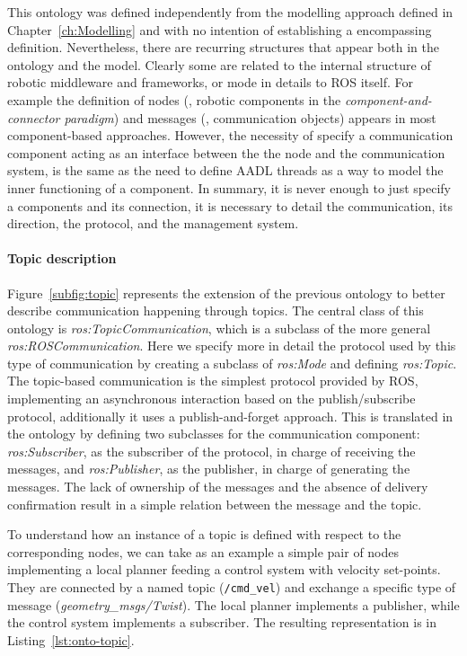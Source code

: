 This ontology was defined independently from the modelling approach defined in Chapter~\ref{ch:Modelling} and with no intention of establishing a encompassing definition. Nevertheless, there are recurring structures that appear both in the ontology and the  model. Clearly some are related to the internal structure of robotic middleware and frameworks, or mode in details to ROS itself. For example the definition of nodes (\ie, robotic components in the \textit{component-and-connector paradigm}) and messages (\ie, communication objects) appears in most component-based approaches. However, the necessity of specify a communication component acting as an interface between the the node and the communication system, is the same as the need to define AADL threads as a way to model the inner functioning of a component. In summary, it is never enough to just specify a components and its connection, it is necessary to detail the communication, its direction, the protocol, and the management system.

\paragraph{Topic description} Figure~\ref{subfig:topic} represents the extension of the previous ontology to better describe communication happening through topics. The central class of this ontology is \textit{ros:Topic\-Com\-mu\-ni\-ca\-tion}, which is a subclass of the more general \textit{ros:ROS\-Com\-mu\-ni\-ca\-tion}. Here we specify more in detail the protocol used by this type of communication by creating a subclass of \textit{ros:Mode} and defining \textit{ros:Topic}. The topic-based communication is the simplest protocol provided by ROS, implementing an asynchronous interaction based on the publish/subscribe protocol, additionally it uses a publish-and-forget approach. This is translated in the ontology by defining two subclasses for the communication component: \textit{ros:Subscriber}, as the subscriber of the protocol, in charge of receiving the messages, and \textit{ros:Publisher}, as the publisher, in charge of generating the messages. The lack of ownership of the messages and the absence of delivery confirmation result in a simple relation between the message and the topic.

To understand how an instance of a topic is defined with respect to the corresponding nodes, we  can take as an example a simple pair of nodes implementing a local planner feeding a control system with velocity set-points. They are connected by a named topic (\texttt{/cmd\_vel}) and exchange a specific type of message (\textit{geometry\_msgs/Twist}). The local planner implements a publisher, while the control system implements a subscriber. The resulting representation is in Listing~\ref{lst:onto-topic}.

